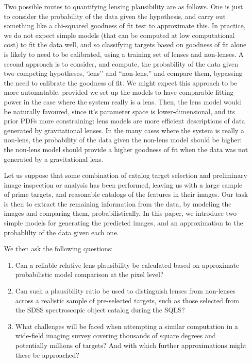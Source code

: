 \documentclass[useAMS,usenatbib]{mn2e}
\begin{document}
Two possible routes to quantifying lensing plausibility are as follows. One
is just to consider the probability of the data given the hypothesis, and
carry out something like a chi-squared goodness of fit test to approximate
this.  In practice, we do not expect simple models (that can be computed at
low computational cost) to fit the data well, and so classifying targets
based on goodness of fit alone is likely to need to be calibrated, using a
training set of lenses and non-lenses. A second approach is to consider,
and compute, the probability of the data given two competing hypotheses,
`lens'' and ``non-lens,'' and compare them, bypassing the need to calibrate
the goodness of fit. We might expect this approach to be more automatable,
provided we set up the models to have comparable fitting power in the case
where the system really is a lens.  Then, the lens model would be
naturally favoured, since it's parameter space is lower-dimensional, and
its prior PDFs more constraining: lens models are more efficient
descriptions of data generated by gravitational lenses. In the many cases
where the system is really a non-lens, the probability of the data given
the non-lens model should be higher: the non-lens model should provide a
higher goodness of fit when the data was not generated by a gravitational
lens.

Let us suppose that some combination of catalog target selection and
preliminary image inspection or analysis has been performed, leaving us
with a large sample of prime targets, and reasonable catalogs of the
features in their images. Our task is then to extract the remaining
information from the data, by modeling the images and comparing them,
probabilistically.  In this paper, we introduce two simple models for
generating the predicted  images, and an approximation to the probablilty
of the data given each one.

We then ask the following questions:
\begin{enumerate}
%
\item Can a reliable relative lens plausibility be calculated based on
approximate probabilistic model comparison at the pixel level?
%
\item Can such a plausibility ratio be used to distinguish lenses from
non-lenses across a realistic sample of pre-selected targets, such as those
selected from the SDSS spectroscopic object catalog during the SQLS?
%
\item What challenges will be faced when attempting a similar computation in a
wide-field imaging survey covering thousands of square degrees and potentially
millions of targets? And with which further approximations might these be
approached?
%
\end{enumerate}
\end{document}
